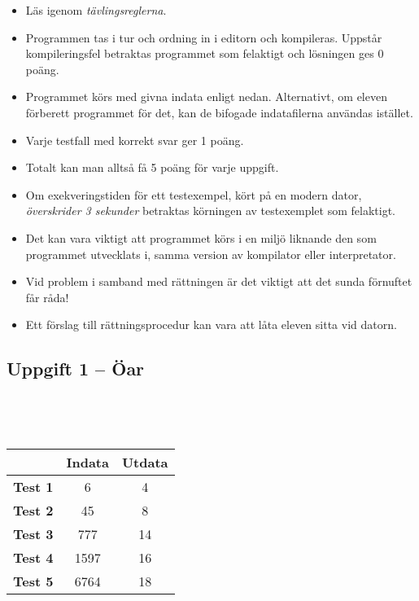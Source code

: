 \documentclass[a4paper,12pt,oneside]{amsbook}
\theoremstyle{test}
\newcommand{\fe}[1]{\textbf{#1}}            %
\begin{document}


\thispagestyle{fancy}
\lhead{}
\begin{itemize}
\item Läs igenom \textit{tävlingsreglerna}.
\item Programmen tas i tur och ordning in i editorn och kompileras.
Uppstår kompileringsfel betraktas programmet som felaktigt och lösningen
ges $0$ poäng.
\item Programmet körs med givna indata enligt nedan. Alternativt, om eleven förberett programmet för det, kan de bifogade indatafilerna användas istället.
\item Varje testfall
  med korrekt svar ger 1 poäng.
\item
Totalt kan man
  alltså få 5 poäng för varje uppgift.
\item Om exekveringstiden för ett testexempel, kört på en modern dator,
\textit{överskrider 3 sekunder} betraktas körningen av testexemplet som felaktigt.
\item Det kan vara viktigt att programmet körs i en miljö liknande den som
programmet utvecklats i, samma version av kompilator eller
interpretator.
\item Vid problem i samband med rättningen är det viktigt att det sunda
förnuftet får råda!
\item Ett förslag till rättningsprocedur kan vara att låta eleven
sitta vid datorn.
\end{itemize}

\vspace{2cm}

\subsection*{Uppgift 1 -- Öar}
~\\
{\tt 
\begin{tabular}{||l||c||c||}\hline\hline
& {\fe{Indata}} & \fe{Utdata} \\ \hline \hline
\fe{Test 1} & 6 & 4 \\ \hline
\fe{Test 2} & 45 & 8 \\ \hline
\fe{Test 3} & 777 & 14 \\ \hline
\fe{Test 4} & 1597 & 16 \\ \hline
\fe{Test 5} & 6764 & 18 \\ \hline\hline
\end{tabular}
}
\end{document}
